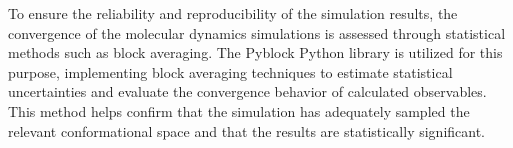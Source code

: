 To ensure the reliability and reproducibility of the simulation results, the convergence of the molecular dynamics simulations is assessed through statistical methods such as block averaging.
The Pyblock Python library is utilized for this purpose, implementing block averaging techniques to estimate statistical uncertainties and evaluate the convergence behavior of calculated observables.
This method helps confirm that the simulation has adequately sampled the relevant conformational space and that the results are statistically significant.
